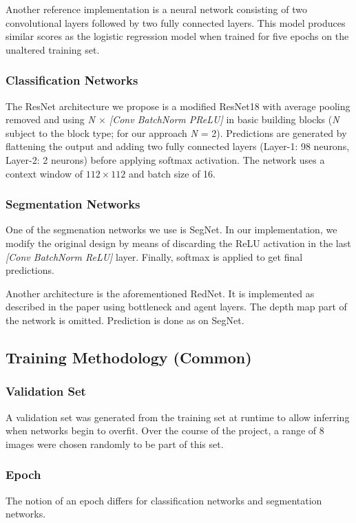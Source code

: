 \documentclass[10pt,conference,compsocconf]{IEEEtran}
\begin{document}
Another reference implementation is a neural network consisting of two convolutional layers followed by two fully connected layers. This model produces similar scores as the logistic regression model when trained for five epochs on the unaltered training set.

\subsubsection{Classification Networks}
The ResNet architecture we propose is a modified ResNet18\cite{he2016deep} with average pooling removed and using \emph{N $\times$ [Conv BatchNorm PReLU]} in basic building blocks (\emph{N}  subject to the block type; for our approach \emph{N} = 2). Predictions are generated by flattening the output and adding two fully connected layers (Layer-1: 98 neurons, Layer-2: 2 neurons) before applying softmax activation. The network uses a context window of $112 \times 112$ and batch size of 16.

\subsubsection{Segmentation Networks}
One of the segmenation networks we use is SegNet\cite{badrinarayanan2015segnet}. In our implementation, we modify the original design by means of discarding the ReLU activation in the last \emph{[Conv BatchNorm ReLU]} layer. Finally, softmax is applied to get final predictions.

Another architecture is the aforementioned RedNet\cite{jiang2018rednet}. It is implemented as described in the paper using bottleneck and agent layers. The depth map part of the network is omitted. Prediction is done as on SegNet.

\subsection{Training Methodology (Common)}
\label{subsec:training-methodology}

\subsubsection{Validation Set}
A validation set was generated from the training set at runtime to allow inferring when networks begin to overfit. Over the course of the project, a range of 8 images were chosen randomly to be part of this set.

\subsubsection{Epoch}
The notion of an epoch differs for classification networks and segmentation networks.
\end{document}
